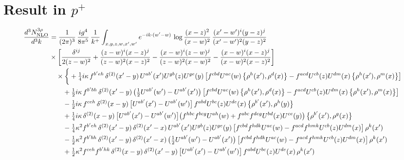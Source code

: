 \documentclass[10pt]{article}
\numberwithin{equation}{section}
\begin{document}
\section{Result in $p^{+}$}
\begin{align}
\frac{d^{3}N^{3\rho}_{\rm NLO}}{d^{3}k}&=\frac{1}{(2\pi)^{3}}\,\frac{ig^{4}}{8\pi^{5}}\,\frac{1}{k^{+}}\int_{x,y,z,w,x^{\prime},w^{\prime}}e^{-ik\cdot(w^{\prime}-w)}\,\log\frac{(x-z)^{2}}{(x-w)^{2}}\,\frac{(x^{\prime}-w^{\prime})^{i}(y-z)^{j}}{(x^{\prime}-w^{\prime})^{2}(y-z)^{2}}\notag\\
&\times\bigg[\frac{\delta^{ij}}{2(z-w)^{2}}+\frac{(z-w)^{i}(x-z)^{j}}{(z-w)^{2}(x-z)^{2}}-\frac{(x-w)^{i}(z-w)^{j}}{(z-w)^{2}(x-w)^{2}}-\frac{(x-w)^{i}(x-z)^{j}}{(x-w)^{2}(x-z)^{2}}\bigg]\notag\\
&\quad\times\bigg\{+\tfrac14 i\kappa\,f^{b^{\prime}eh}\,\delta^{(2)}(x^{\prime}-y)\,U^{ab^{\prime}}(x^{\prime})U^{gb}(z)U^{ge}(y)\,\big[f^{cbd}U^{ac}(w)\,\big\{\rho^{h}(x^{\prime}),\rho^{d}(x)\big\}-f^{acd}U^{cb}(z)U^{dm}(x)\,\big\{\rho^{h}(x^{\prime}),\rho^{m}(x)\big\}\big]\notag\\
&\qquad+\tfrac12 i\kappa\,f^{b^{\prime}bh}\,\delta^{(2)}(x^{\prime}-y)\,\big(\tfrac12U^{ab^{\prime}}(w^{\prime})-U^{ab^{\prime}}(x^{\prime})\big)\,\big[f^{cbd}U^{ac}(w)\,\big\{\rho^{h}(x^{\prime}),\rho^{d}(x)\big\}-f^{acd}U^{cb}(z)U^{dm}(x)\,\big\{\rho^{h}(x^{\prime}),\rho^{m}(x)\big\}\big]\notag\\
&\qquad-\tfrac12 i\kappa\,f^{ceh}\,\delta^{(2)}(x-y)\,\big[U^{ab^{\prime}}(x^{\prime})-U^{ab^{\prime}}(w^{\prime})\big]\,f^{abd}U^{bc}(z)U^{de}(x)\,\big\{\rho^{b^{\prime}}(x^{\prime}),\rho^{h}(y)\big\}\notag\\
&\qquad+\tfrac14 i\kappa\,\delta^{(2)}(x-y)\,\big[U^{ab^{\prime}}(x^{\prime})-U^{ab^{\prime}}(w^{\prime})\big]\big(f^{hbc}f^{bcg}U^{ah}(w)+f^{abc}f^{deg}U^{bd}(x)U^{ce}(y)\big)\,\big\{\rho^{b^{\prime}}(x^{\prime}),\rho^{g}(x)\big\}\notag\\
&\qquad-\tfrac14\kappa^{2}f^{b^{\prime}eh}\,\delta^{(2)}(x^{\prime}-y)\,\delta^{(2)}(x^{\prime}-x)\,U^{ab^{\prime}}(x^{\prime})U^{gb}(z)U^{ge}(y)\,\big[f^{cbd}f^{hdk}U^{ac}(w)-f^{acd}f^{hmk}U^{cb}(z)U^{dm}(x)\big]\,\rho^{k}(x^{\prime})\notag\\
&\qquad-\tfrac12\kappa^{2}f^{b^{\prime}bh}\,\delta^{(2)}(x^{\prime}-y)\,\delta^{(2)}(x^{\prime}-x)\,\big(\tfrac12U^{ab^{\prime}}(w^{\prime})-U^{ab^{\prime}}(x^{\prime})\big)\,\big[f^{cbd}f^{hdk}U^{ac}(w)-f^{acd}f^{hmk}U^{cb}(z)U^{dm}(x)\big]\,\rho^{k}(x^{\prime})\notag\\
&\qquad+\tfrac12\kappa^{2}f^{ceh}f^{b^{\prime}hk}\,\delta^{(2)}(x-y)\,\delta^{(2)}(x^{\prime}-y)\,\big[U^{ab^{\prime}}(x^{\prime})-U^{ab^{\prime}}(w^{\prime})\big]\,f^{abd}U^{bc}(z)U^{de}(x)\,\rho^{k}(x^{\prime})\notag\\

\end{align}
\end{document}
